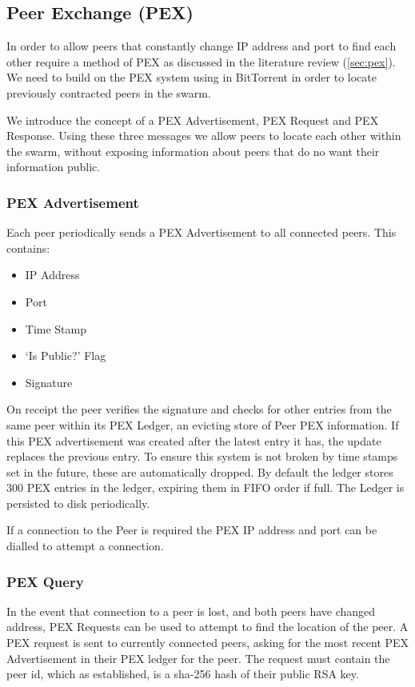 \documentclass[11pt, a4paper, twoside]{report}
\begin{document}
\subsection{Peer Exchange (PEX)}

In order to allow peers that constantly change IP address and port to find each other require a method of PEX as discussed in the literature review (\ref{sec:pex}). We need to build on the PEX system using in BitTorrent in order to locate previously contracted peers in the swarm.

We introduce the concept of a PEX Advertisement, PEX Request and PEX Response. Using these three messages we allow peers to locate each other within the swarm, without exposing information about peers that do no want their information public.

\subsubsection{PEX Advertisement}

Each peer periodically sends a PEX Advertisement to all connected peers. This contains:

\begin{itemize}
 \item IP Address
 \item Port
 \item Time Stamp
 \item `Is Public?' Flag
 \item Signature
\end{itemize}

On receipt the peer verifies the signature and checks for other entries from the same peer within its PEX Ledger, an evicting store of Peer PEX information. If this PEX advertisement was created after the latest entry it has, the update replaces the previous entry. To ensure this system is not broken by time stamps set in the future, these are automatically dropped. By default the ledger stores 300 PEX entries in the ledger, expiring them in FIFO order if full. The Ledger is persisted to disk periodically.

If a connection to the Peer is required the PEX IP address and port can be dialled to attempt a connection.

\subsubsection{PEX Query}

In the event that connection to a peer is lost, and both peers have changed address, PEX Requests can be used to attempt to find the location of the peer. A PEX request is sent to currently connected peers, asking for the most recent PEX Advertisement in their PEX ledger for the peer. The request must contain the peer id, which as established, is a sha-256 hash of their public RSA key.
\end{document}
